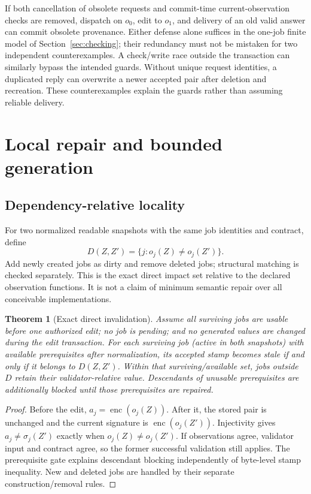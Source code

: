 \documentclass[pdflatex,sn-mathphys-num]{sn-jnl}
\theoremstyle{thmstyleone}
\newtheorem{theorem}{Theorem}
\theoremstyle{thmstylethree}
\theoremstyle{thmstyletwo}
\newcommand{\Sig}{\sigma}
\begin{document}
If both cancellation of obsolete requests and commit-time current-observation checks are removed, dispatch on $o_0$, edit to $o_1$, and delivery of an old valid answer can commit obsolete provenance. Either defense alone suffices in the one-job finite model of Section~\ref{sec:checking}; their redundancy must not be mistaken for two independent counterexamples. A check/write race outside the transaction can similarly bypass the intended guards. Without unique request identities, a duplicated reply can overwrite a newer accepted pair after deletion and recreation. These counterexamples explain the guards rather than assuming reliable delivery.

\section{Local repair and bounded generation}\label{sec:local}
\subsection{Dependency-relative locality}
For two normalized readable snapshots with the same job identities and contract, define
\begin{equation}\label{eq:impact}
D(Z,Z')=\{j:o_j(Z)\ne o_j(Z')\}.
\end{equation}
Add newly created jobs as dirty and remove deleted jobs; structural matching is checked separately. This is the exact direct impact set relative to the declared observation functions. It is not a claim of minimum semantic repair over all conceivable implementations.

\begin{theorem}[Exact direct invalidation]\label{thm:local}
Assume all surviving jobs are usable before one authorized edit; no job is pending; and no generated values are changed during the edit transaction. For each surviving job (active in both snapshots) with available prerequisites after normalization, its accepted stamp becomes stale if and only if it belongs to $D(Z,Z')$. Within that surviving/available set, jobs outside $D$ retain their validator-relative value. Descendants of unusable prerequisites are additionally blocked until those prerequisites are repaired.
\end{theorem}
\begin{proof}
Before the edit, $a_j=\operatorname{enc}(o_j(Z))$. After it, the stored pair is unchanged and the current signature is $\operatorname{enc}(o_j(Z'))$. Injectivity gives $a_j\ne\Sig_j(Z')$ exactly when $o_j(Z)\ne o_j(Z')$. If observations agree, validator input and contract agree, so the former successful validation still applies. The prerequisite gate explains descendant blocking independently of byte-level stamp inequality. New and deleted jobs are handled by their separate construction/removal rules.\qedhere
\end{proof}
\end{document}
